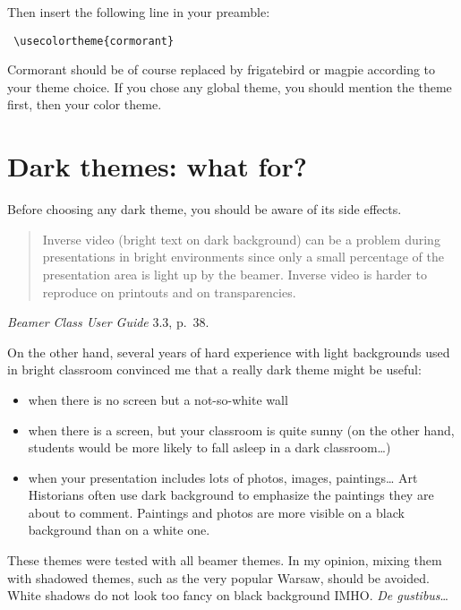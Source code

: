 \documentclass[12pt]{article}
\begin{document}
Then insert the following line in your preamble:
\begin{verbatim}
 \usecolortheme{cormorant}
\end{verbatim}

Cormorant should be of course replaced by \ttfamily frigatebird \rmfamily or \ttfamily magpie \rmfamily according to your theme choice.
If you chose any global theme, you should mention the theme first, then your color theme.

\section{Dark themes: what for?}

Before choosing any dark theme, you should be aware of its side effects.

\begin{quotation}
        Inverse video (bright text on dark background) can be a problem during presentations in bright environments since only a small percentage of the presentation area is light up by the beamer. Inverse video is harder to reproduce on printouts and on transparencies.
\end{quotation}

\begin{flushright}
  \emph{Beamer Class User Guide} 3.3, p.~38. 
\end{flushright}

On the other hand, several years of hard experience with light backgrounds used in bright classroom convinced me that a really dark theme might be useful: 
\begin{itemize}
    \item when there is no screen but a not-so-white wall 
    \item when there is a screen, but your classroom is quite sunny (on the other hand, students would be more likely to fall asleep in a dark classroom…) 
    \item when your presentation includes lots of photos, images, paintings… Art Historians often use dark background to emphasize the paintings they are about to comment. Paintings and photos are more visible on a black background than on a white one.
\end{itemize}

These themes were tested with all beamer themes. In my opinion, mixing them with shadowed themes, such as the very popular Warsaw, should be avoided. White shadows do not look too fancy on black background IMHO. \emph{De gustibus}…
\end{document}
